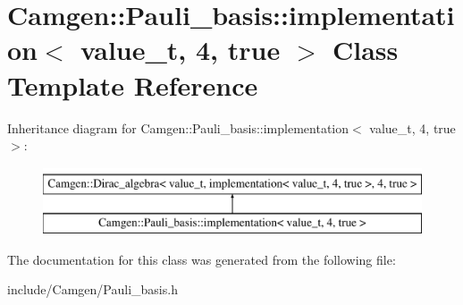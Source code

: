 \hypertarget{a00307}{}\section{Camgen\+:\+:Pauli\+\_\+basis\+:\+:implementation$<$ value\+\_\+t, 4, true $>$ Class Template Reference}
\label{a00307}
Inheritance diagram for Camgen\+:\+:Pauli\+\_\+basis\+:\+:implementation$<$ value\+\_\+t, 4, true $>$\+:\begin{figure}[H]
\begin{center}
\leavevmode
\includegraphics[height=2.000000cm]{a00307}
\end{center}
\end{figure}


The documentation for this class was generated from the following file\+:\begin{DoxyCompactItemize}
\item 
include/\+Camgen/Pauli\+\_\+basis.\+h\end{DoxyCompactItemize}
